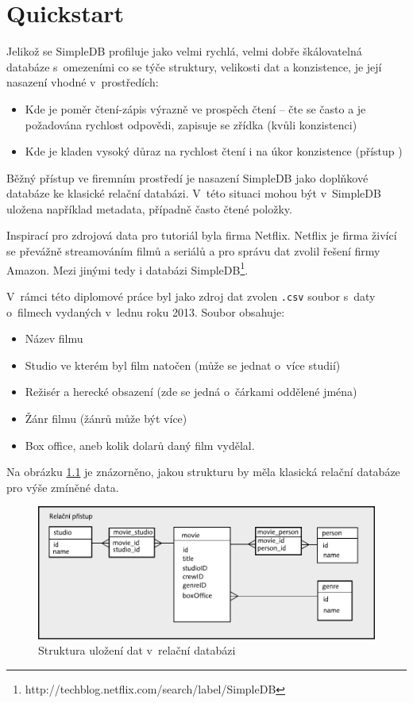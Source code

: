 \documentclass[oneside,12pt]{fithesis2}
\begin{document}
\chapter{Quickstart}
\label{quickstart}
Jelikož se SimpleDB profiluje jako velmi rychlá, velmi dobře škálovatelná databáze s~omezeními co se týče struktury, velikosti dat a konzistence, je její nasazení vhodné v~prostředích:
\begin{itemize}
 \item Kde je poměr čtení-zápis výrazně ve prospěch čtení -- čte se často a je požadována rychlost odpovědi, zapisuje se zřídka (kvůli konzistenci)
 \item Kde je kladen vysoký důraz na rychlost čtení i na úkor konzistence (přístup )
\end{itemize}
Běžný přístup ve firemním prostředí je nasazení SimpleDB jako doplňkové databáze ke klasické relační databázi. V~této situaci mohou být v~SimpleDB uložena například metadata, případně často čtené položky.

Inspirací pro zdrojová data pro tutoriál byla firma Netflix. Netflix je firma živící se převážně streamováním filmů a seriálů a pro správu dat zvolil řešení firmy Amazon. Mezi jinými tedy i databázi SimpleDB\footnote{http://techblog.netflix.com/search/label/SimpleDB}.

V~rámci této diplomové práce byl jako zdroj dat zvolen \texttt{.csv} soubor s~daty o~filmech vydaných v~lednu roku 2013. Soubor obsahuje:
\begin{itemize}
 \item Název filmu
 \item Studio ve kterém byl film natočen (může se jednat o~více studií)
 \item Režisér a herecké obsazení (zde se jedná o~čárkami oddělené jména)
 \item Žánr filmu (žánrů může být více)
 \item Box office, aneb kolik dolarů daný film vydělal.
\end{itemize}
Na obrázku \ref{relationStructure} je znázorněno, jakou strukturu by měla klasická relační databáze pro výše zmíněné data. 
\begin{figure}[h]
 \centering
 \includegraphics[scale=0.8]{relationStructure}
 \caption{Struktura uložení dat v~relační databázi}
 \label{relationStructure}
\end{figure}
\end{document}
